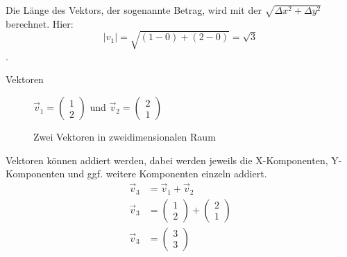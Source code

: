 \documentclass[aspectratio=169, ignorenonframetext]{beamer}
\begin{document}
Die Länge des Vektors, der sogenannte Betrag, wird mit der $\sqrt{\Delta x^2 + \Delta y^2}$ berechnet. Hier: \[|v_1| = \sqrt{(1 - 0) + (2 - 0)} = \sqrt{3}\].
\begin{frame}{Vektoren}
  \begin{figure}[htb]

    $\vec{v}_1= \left(\begin{array}{c} 1 \\ 2 \end{array}\right)$ und  $\vec{v}_2= \left(\begin{array}{c} 2 \\ 1 \end{array}\right)$
    \caption{Zwei Vektoren in zweidimensionalen Raum}
    \label{fig:ZweiVektoren}
  \end{figure}
\end{frame}

Vektoren können addiert werden, dabei werden jeweils die X-Komponenten, Y-Komponenten und ggf. weitere Komponenten einzeln addiert.
\begin{align}
  \vec{v}_3 &= \vec{v}_1 + \vec{v}_2\\
  \vec{v}_3 &= \left(\begin{array}{c} 1 \\ 2 \end{array}\right) + \left(\begin{array}{c} 2 \\ 1 \end{array}\right)\\
  \vec{v}_3 &= \left(\begin{array}{c} 3 \\ 3 \end{array}\right)
\end{align}
\end{document}
